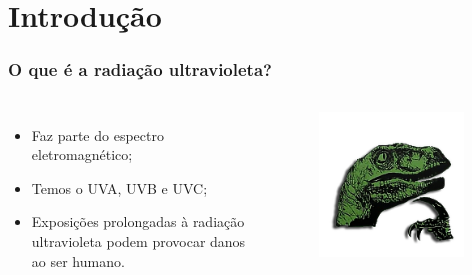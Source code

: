 \documentclass{beamer}
\begin{document}
	\section{Introdução}
	\begin{frame}
		\frametitle{O que é a radiação ultravioleta?}
			
		\begin{columns}
			\begin{itemize}
				\item Faz parte do espectro eletromagnético;
				\item Temos o UVA, UVB e UVC;
				\item Exposições prolongadas à radiação ultravioleta podem provocar danos ao ser humano.
			\end{itemize}

			\begin{figure}[htb]
				\includegraphics[width=0.95\textwidth]{img/dino.png}
			\end{figure}

		\end{columns}
		
	\end{frame}
	
\end{document}
